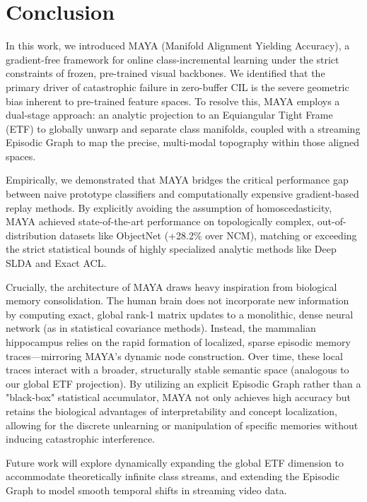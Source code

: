 \section{Conclusion}
\label{sec:conclusion}

In this work, we introduced MAYA (Manifold Alignment Yielding Accuracy), a gradient-free framework for online class-incremental learning under the strict constraints of frozen, pre-trained visual backbones. We identified that the primary driver of catastrophic failure in zero-buffer CIL is the severe geometric bias inherent to pre-trained feature spaces. To resolve this, MAYA employs a dual-stage approach: an analytic projection to an Equiangular Tight Frame (ETF) to globally unwarp and separate class manifolds, coupled with a streaming Episodic Graph to map the precise, multi-modal topography within those aligned spaces. 

Empirically, we demonstrated that MAYA bridges the critical performance gap between naive prototype classifiers and computationally expensive gradient-based replay methods. By explicitly avoiding the assumption of homoscedasticity, MAYA achieved state-of-the-art performance on topologically complex, out-of-distribution datasets like ObjectNet (+28.2\% over NCM), matching or exceeding the strict statistical bounds of highly specialized analytic methods like Deep SLDA and Exact ACL.

Crucially, the architecture of MAYA draws heavy inspiration from biological memory consolidation. The human brain does not incorporate new information by computing exact, global rank-1 matrix updates to a monolithic, dense neural network (as in statistical covariance methods). Instead, the mammalian hippocampus relies on the rapid formation of localized, sparse episodic memory traces—mirroring MAYA's dynamic node construction. Over time, these local traces interact with a broader, structurally stable semantic space (analogous to our global ETF projection). By utilizing an explicit Episodic Graph rather than a "black-box" statistical accumulator, MAYA not only achieves high accuracy but retains the biological advantages of interpretability and concept localization, allowing for the discrete unlearning or manipulation of specific memories without inducing catastrophic interference. 

Future work will explore dynamically expanding the global ETF dimension to accommodate theoretically infinite class streams, and extending the Episodic Graph to model smooth temporal shifts in streaming video data.
